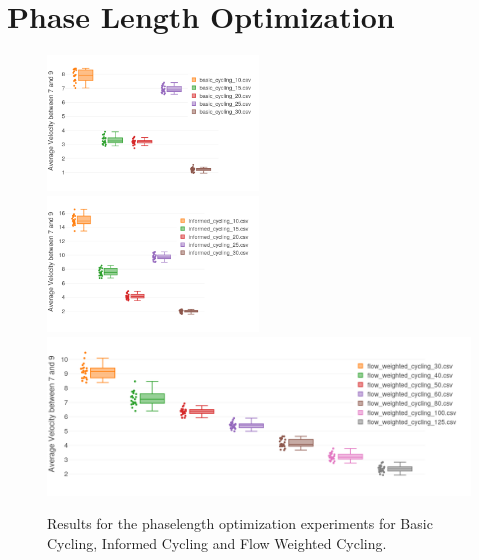 \documentclass[11pt]{article}
\begin{document}
\section{Phase Length Optimization}
\nopagebreak
\begin{figure}[h]
	\includegraphics[width=0.5\textwidth]{img/basic-opt.png}
	\includegraphics[width=0.5\textwidth]{img/informed-opt.png}
	\includegraphics[width=\textwidth]{img/flow-opt.png}
	\caption{Results for the phaselength optimization experiments for Basic Cycling, Informed Cycling and Flow Weighted Cycling. \label{fig:opt-results}}
\end{figure}
\end{document}
